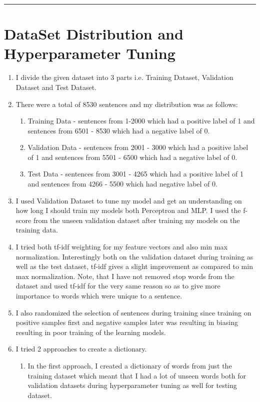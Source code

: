\documentclass[12pt]{article}
\begin{document}
  
	\noindent
  	\rule{\linewidth}{0.4pt}
  	
    \section*{DataSet Distribution and Hyperparameter Tuning}
  \begin{enumerate}[label=(\alph*)]
    \item I divide the given dataset into 3 parts i.e. Training Dataset, Validation Dataset and Test Dataset.
    \item There were a total of 8530 sentences and my distribution was as follows:
    \begin{enumerate}[]
    \item Training Data - sentences from 1-2000 which had a positive label of 1 and sentences from 6501 - 8530 which had a negative label of 0.
    \item Validation Data - sentences from 2001 - 3000 which had a positive label of 1 and sentences from 5501 - 6500 which had a negative label of 0.
    \item Test Data - sentences from 3001 - 4265 which had a positive label of 1 and sentences from 4266 - 5500 which had negative label of 0.
    \end{enumerate}
    \item I used Validation Dataset to tune my model and get an understanding on how long I should train my models both Perceptron and MLP. I used the f-score from the unseen validation dataset after training my models on the training data.
    \item I tried both tf-idf weighting for my feature vectors and also min max normalization. Interestingly both on the validation dataset during training as well as the test dataset, tf-idf gives a slight improvement as compared to min max normalization. Note, that I have not removed stop words from the dataset and used tf-idf for the very same reason so as to give more importance to words which were unique to a sentence.
    \item I also randomized the selection of sentences during training since training on positive samples first and negative samples later was resulting in biasing resulting in poor training of the learning models.
    \item I tried 2 approaches to create a dictionary. 
    \begin{enumerate}
    \item In the first approach, I created a dictionary of words from just the training dataset which meant that I had a lot of unseen words both for validation datasets during hyperparameter tuning as well for testing dataset.

\end{enumerate}
\end{enumerate}
\end{document}
